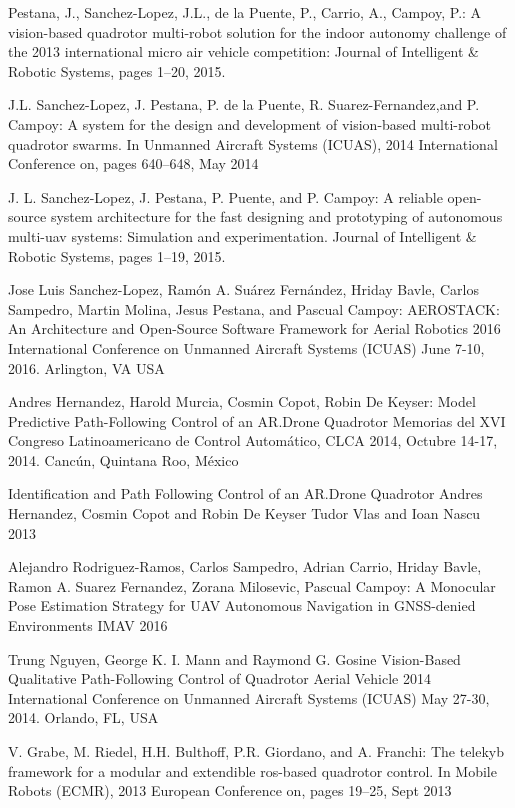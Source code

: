 \documentclass{styles/svproc}
\begin{document}
\begin{thebibliography}{6}
  Pestana, J., Sanchez-Lopez, J.L., de la Puente, P., Carrio, A., Campoy, P.:
  A vision-based quadrotor multi-robot solution for the indoor autonomy challenge of the 2013 international micro air vehicle competition:
  Journal of Intelligent \& Robotic Systems, pages 1–20, 2015.
  
  J.L. Sanchez-Lopez, J. Pestana, P. de la Puente, R. Suarez-Fernandez,and P. Campoy:
  A system for the design and development of vision-based multi-robot quadrotor swarms.
  In Unmanned Aircraft Systems (ICUAS), 2014 International Conference on, pages 640–648, May 2014
  
  J. L. Sanchez-Lopez, J. Pestana, P. Puente, and P. Campoy:
  A reliable open-source system architecture for the fast designing and prototyping of autonomous multi-uav systems: Simulation and experimentation.
  Journal of Intelligent \& Robotic Systems, pages 1–19, 2015.

  Jose Luis Sanchez-Lopez, Ramón A. Suárez Fernández, Hriday Bavle, Carlos Sampedro, Martin Molina, Jesus Pestana, and Pascual Campoy:
  AEROSTACK: An Architecture and Open-Source Software Framework for Aerial Robotics
  2016 International Conference on Unmanned Aircraft Systems (ICUAS) June 7-10, 2016. Arlington, VA USA

  Andres Hernandez, Harold Murcia, Cosmin Copot, Robin De Keyser:
  Model Predictive Path-Following Control of an AR.Drone Quadrotor 
  Memorias del XVI Congreso Latinoamericano de Control Automático, CLCA 2014, Octubre 14-17, 2014. Cancún, Quintana Roo, México

  Identification and Path Following Control of an AR.Drone Quadrotor
  Andres Hernandez, Cosmin Copot and Robin De Keyser Tudor Vlas and Ioan Nascu
  2013

  Alejandro Rodriguez-Ramos, Carlos Sampedro, Adrian Carrio, Hriday Bavle, Ramon A. Suarez Fernandez, Zorana Milosevic, Pascual Campoy:  
  A Monocular Pose Estimation Strategy for UAV Autonomous Navigation in GNSS-denied Environments
  IMAV 2016
  
  Trung Nguyen, George K. I. Mann and Raymond G. Gosine
  Vision-Based Qualitative Path-Following Control of Quadrotor Aerial Vehicle
  2014 International Conference on Unmanned Aircraft Systems (ICUAS) May 27-30, 2014. Orlando, FL, USA

  V. Grabe, M. Riedel, H.H. Bulthoff, P.R. Giordano, and A. Franchi:
  The telekyb framework for a modular and extendible ros-based quadrotor control. 
  In Mobile Robots (ECMR), 2013 European Conference on, pages 19–25, Sept 2013


\end{thebibliography}
\end{document}
